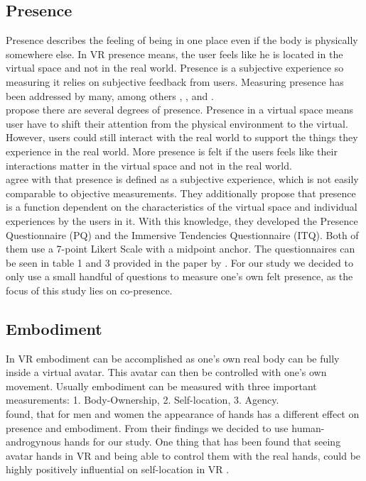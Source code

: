 \documentclass[english,runningheads,a4paper]{llncs}[2018/03/10]
\begin{document}
\subsection{Presence}
Presence describes the feeling of being in one place even if the body is physically somewhere else.
In VR presence means, the user feels like he is located in the virtual space and not in the real world.
Presence is a subjective experience so measuring it relies on subjective feedback from users.
Measuring presence has been addressed by many, among others \citet{Sanchez-Vives2005a}, \citet{Witmer1998b}, and \citet{Slater}. \\ \linebreak
\citet{Witmer1998b} propose there are several degrees of presence.
Presence in a virtual space means user have to shift their attention from the physical environment to the virtual.
However, users could still interact with the real world to support the things they experience in the real world.
More presence is felt if the users feels like their interactions matter in the virtual space and not in the real world. \\ \linebreak
\citet{Witmer1998b} agree with \citet{Sheridan} that presence is defined as a subjective experience, which is not easily comparable to objective measurements.
They additionally propose that presence is a function dependent on the characteristics of the virtual space and individual experiences by the users in it.
With this knowledge, they developed the Presence Questionnaire (PQ) and the Immersive Tendencies Questionnaire (ITQ).
Both of them use a 7-point Likert Scale with a midpoint anchor.
The questionnaires can be seen in table 1 and 3 provided in the paper by \citet{Witmer1998b}.
For our study we decided to only use a small handful of questions to measure one's own felt presence, as the focus of this study lies on co-presence.

\subsection{Embodiment}

In VR embodiment can be accomplished as one's own real body can be fully inside a virtual avatar.
This avatar can then be controlled with one's own movement.
Usually embodiment can be measured with three important measurements: 1. Body-Ownership, 2. Self-location, 3. Agency. \\ \linebreak
\citet{Schwind2017} found, that for men and women the appearance of hands has a different effect on presence and embodiment. 
From their findings we decided to use human-androgynous hands for our study.  
One thing that has been found that seeing avatar hands in VR and being able to control them with the real hands, could be highly positively influential on self-location in VR \cite{leusmann}. 
\end{document}
